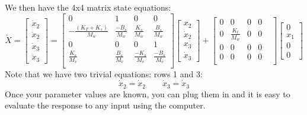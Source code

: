 \begin{Example}
We then have the 4x4 matrix state equations:
\[
\dot{X} = \begin{bmatrix}\dot{x}_2 \\ \ddot{x}_2 \\ \dot{x}_3 \\ \ddot{x}_3\end{bmatrix}
=
\begin{bmatrix} 0&1&0&0\\
-\frac{(K_T+K_s)}{M_w}&\frac{-B_s}{M_w}&\frac{K_s}{M_w}&\frac{B_s}{M_w}\\
0&0&0&1 \\
\frac{K_s}{M_v}&\frac{B_s}{M_v}&\frac{-K_s}{M_v}&\frac{-B_s}{M_v}\\
\end{bmatrix}
\begin{bmatrix}x_2\\\dot{x}_2\\x_3\\\dot{x}_3 \end{bmatrix}+
\begin{bmatrix}
    0&0&0&0&\\
    0&\frac{K_t}{M_w}&0&0&\\
    0&0&0&0&\\
    0&0&0&0&\\
\end{bmatrix}
\begin{bmatrix} 0 \\x_1\\0\\ 0\end{bmatrix}
\]
Note that we have two trivial equations: rows 1 and 3:
\[
\dot{x}_2 = \dot{x}_2 \qquad \dot{x}_3 = \dot{x}_3
\]
Once your parameter values are known, you can plug them in and it is easy to evaluate the response to any input using the computer.
\end{Example}

%
%


